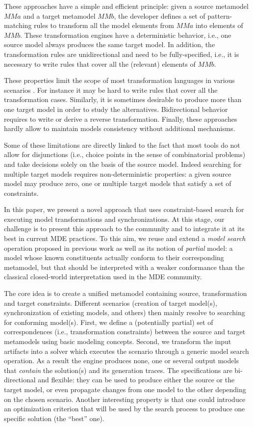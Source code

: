 \documentclass{llncs}
\begin{document}
These approaches have a simple and efficient principle: given a source metamodel $MMa$ and a
target metamodel $MMb$, the developer defines a set of pattern-matching rules to transform all the model elements from $MMa$ into elements of $MMb$. These transformation engines have a deterministic behavior,
i.e., one source model always produces the same target model. In addition, the
transformation rules  are unidirectional and need to be fully-specified, i.e., it is necessary to
write rules that cover all the (relevant) elements of $MMb$.

These properties limit the scope of most transformation languages in various scenarios \cite{DBLP:conf/icmt/CzarneckiFHLST09}. For instance it may be hard to write rules that cover all the transformation cases. Similarly, it is sometimes desirable to produce more than one target model in order to study the alternatives. Bidirectional behavior requires to write or derive a reverse transformation. Finally, these approaches hardly allow to maintain models consistency without additional mechanisms.

Some of these limitations are directly linked to the fact that most tools do not allow
for disjunctions (i.e., choice points in the sense of combinatorial problems) and take decisions solely on the basis of
the source model. Indeed searching for multiple target models requires non-deterministic
properties: a given source model may produce zero, one or multiple target models
that satisfy a set of constraints.

In this paper, we present a novel approach that uses constraint-based search for
executing model transformations and synchronizations. At this stage, our challenge is to present this approach to
the community and to integrate it at its best in current MDE 
practices. To this aim, we reuse and extend a \emph{model search} operation proposed in previous work\cite{modelsearch09} as well as its notion of {\it partial} model: a model whose known constituents actually conform to their corresponding metamodel, but that should be interpreted with a weaker conformance than the classical closed-world interpretation used in the MDE community.

The core idea is to create a unified metamodel containing source, transformation and target constraints. Different scenarios (creation of target model(s), synchronization of existing models, and others) then mainly resolve to searching for conforming model(s).  
First, we define a (potentially partial) set of correspondences (i.e., transformation constraints) between the source and target
metamodels using basic modeling concepts. Second, we transform the input artifacts into a solver which executes the scenario through a generic model search operation. As a result the engine produces none, one or several output models that \emph{contain} the 
solution(s) and its generation traces. The specifications are
bi-directional and flexible: they can be used to produce either the source or the target
model, or even propagate changes from one model to the other depending on the chosen scenario. 
Another interesting property is that one could introduce an
optimization criterion that will be used by the search process to produce one
specific solution (the ``best'' one). 
%
\end{document}
